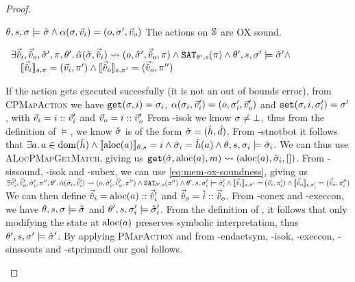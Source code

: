 \begin{proof}


\pfassume \begin{hypvlist}
 $\theta,s,\st\models\sst \land \ppexecc{\alpha}{\st,\ins}{o,\st',\outs}$
 The actions on $\mmdl$ are OX sound.
\end{hypvlist}
\pfprove \begin{goalvlist}
 $
\begin{array}{l}
\exists \sins,\souts,\sst',\pc,\theta'\ldotp \ppexec{\hat\alpha}{\sst,\sins}{o,\sst',\souts,\pc} \land \SAT[\theta',s](\pc) \land \theta',s,\st'\models \sst' \land\\
\quad \expeval[s,\pc]{\sins}=(\ins,\pc')\land\expeval[s,\pc']{\souts}=(\souts,\pc'')
\end{array}$
\end{goalvlist}

\begin{hypvlist}
 If the action gets executed succesfully (it is not an out of bounds error), from \textsc{CPMapAction} we have $\ppgetc{\st,i}{\st_i}$,  $\ppexecc{\alpha}{\st_i,\ins'}{o,\st'_i,\outs'}$ and $\ppset{\st,i,\st'_i}{\st'}$, with $\ins=i::\ins'$ and $\outs=i::\outs'$
 From \hyp{isok} we know $\st\neq\bot$, thus from the definition of $\models$, we know $\sst$ is of the form $\sst=(\sym h, \sym d)$.%
 From \hyp{stnotbot} it follows that $\exists a\ldotp a\in\dom(\sym h) \land \expeval{\aloc a}=i \land \sst_i=\sym h(a) \land \theta,s,\st_i\models\sst_i$.%
 We can thus use \textsc{ALocPMapGetMatch}, giving us $\ppget{\sst,\aloc a,m}{\aloc a, \sst_i, []}$.%
 From \hyp{sissound}, \hyp{isok} and \hyp{subex}, we can use \ref{eq:mem-ox-soundness}, giving us $\exists \sins',\souts',\sst_i',\pc'',\theta'\ldotp \ppexec{\hat\alpha}{\sst_i,\sins'}{o,\sst_i',\souts',\pc''} \land \SAT[\theta',s](\pc'') \land \theta',s,\st_i'\models \sst_i' \land \expeval[s,\pc']{\sins}=(\ins,\pc_i')\land\expeval[s,\pc_i']{\souts}=(\souts,\pc_i'')$
 We can then define $\sins=\aloc a::\sins'$ and $\souts=\sym i::\souts$.
 From \hyp{conex} and \hyp{execcon}, we have $\theta,s,\st\models\sst$ and $\theta',s,\st_i'\models\sst_i'$. From the definition of , it follows that only modifying the state at $\aloc a$ preserves symbolic interpretation, thus $\theta',s,\st'\models\sst'$.
 By applying \textsc{PMapAction} and from \hyp{endactsym}, \hyp{isok}, \hyp{execcon}, \hyp{sinssouts} and \hyp{stprimmdl} our goal  follows.
\end{hypvlist}


\end{proof}
